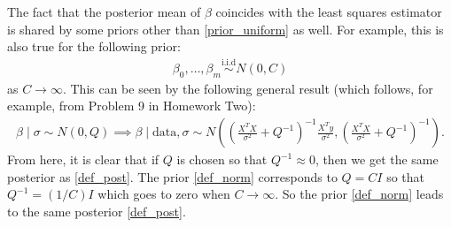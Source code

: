 \documentclass{scrartcl}
\begin{document}
The fact that the posterior mean of $\beta$ coincides with the least
squares estimator is shared by some priors other than
\eqref{prior_uniform} as well. For example, this is also true for the
following prior:
\begin{align}\label{def_norm}
  \beta_0, \dots, \beta_m \overset{\text{i.i.d}}{\sim} N(0, C) 
\end{align}
as $C \rightarrow \infty$. This can be seen by the following general
result (which follows, for example, from Problem 9 in Homework Two):
\begin{align}\label{normnorm}
  \beta \mid \sigma \sim N(0, Q) \implies 
  \beta \mid \text{data}, \sigma \sim N \left(\left(\frac{X^T
  X}{\sigma^2} + Q^{-1} \right)^{-1} \frac{X^T y}{\sigma^2},
  \left(\frac{X^T X}{\sigma^2} + Q^{-1}\right)^{-1} \right). 
\end{align}
From here, it is clear that if $Q$ is chosen so that $Q^{-1} \approx
0$, then we get the same posterior as \eqref{def_post}. The prior
\eqref{def_norm} corresponds to $Q = C I$ so that $Q^{-1} = (1/C)I$
which goes to zero when $C \rightarrow \infty$. So the prior
\eqref{def_norm} leads to the same posterior \eqref{def_post}. 
\end{document}
